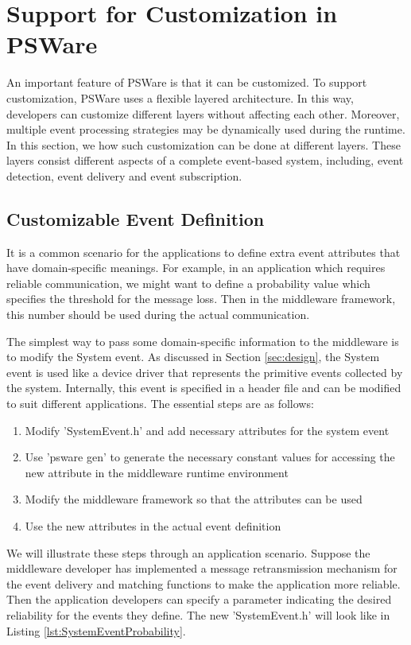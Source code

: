 \section{Support for Customization in PSWare}
\label{sec:flexibility}
An important feature of PSWare is that it can be customized. To support customization, PSWare uses a flexible layered architecture. In this way, developers can customize different layers without affecting each other. Moreover, multiple event processing strategies may be dynamically used during the runtime. In this section, we how such customization can be done at different layers. These layers consist different aspects of a complete event-based system, including, event detection, event delivery and event subscription.

\subsection{Customizable Event Definition}
It is a common scenario for the applications to define extra event attributes that have domain-specific meanings. For example, in an application which requires reliable communication, we might want to define a probability value which specifies the threshold for the message loss. Then in the middleware framework, this number should be used during the actual communication.

The simplest way to pass some domain-specific information to the middleware is to modify the System event. As discussed in Section \ref{sec:design}, the System event is used like a device driver that represents the primitive events collected by the system. Internally, this event is specified in a header file and can be modified to suit different applications. The essential steps are as follows:
\begin{enumerate}
\item Modify 'SystemEvent.h' and add necessary attributes for the system event
\item Use 'psware gen' to generate the necessary constant values for accessing the new attribute in the middleware runtime environment
\item Modify the middleware framework so that the attributes can be used
\item Use the new attributes in the actual event definition
\end{enumerate}

We will illustrate these steps through an application scenario. Suppose the middleware developer has implemented a message retransmission mechanism for the event delivery and matching functions to make the application more reliable. Then the application developers can specify a parameter indicating the desired reliability for the events they define. The new 'SystemEvent.h' will look like in Listing \ref{lst:SystemEventProbability}.

